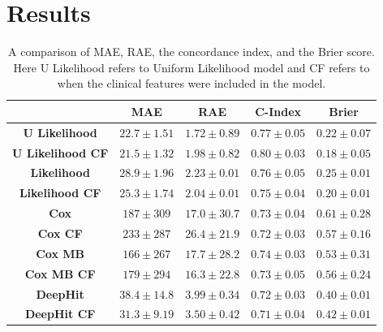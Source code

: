 \vspace{-0.5cm}

\section{Results} \label{sec:results}   
    \begin{table}
        \vspace{-0.5cm}
        
        \centering
        
        \captionsetup{singlelinecheck=false, justification=centering}
        \caption{
            \tiny
            A comparison of \gls{MAE}, \gls{RAE}, the concordance index, and the Brier score. Here U Likelihood refers to Uniform Likelihood model and CF refers to when the clinical features were included in the model.
        }
        
        \vspace{-0.25cm}
        
        \resizebox*{1.0\linewidth}{0.1\textheight}
        {
            \begin{tabular}{||c|cc|c|c||}
                \hline
                                            & \textbf{\gls{MAE}} & \textbf{\gls{RAE}} & \textbf{C-Index}  & \textbf{Brier}    \\
                \hline
                \textbf{U Likelihood}       & $22.7\pm1.51$      & $1.72\pm0.89$      & $0.77\pm0.05$     & $0.22\pm0.07$      \\
                \textbf{U Likelihood CF}    & $21.5\pm1.32$      & $1.98\pm0.82$      & $0.80\pm0.03$     & $0.18\pm0.05$      \\
                \textbf{Likelihood}         & $28.9\pm1.96$      & $2.23\pm0.01$      & $0.76\pm0.05$     & $0.25\pm0.01$      \\
                \textbf{Likelihood CF}      & $25.3\pm1.74$      & $2.04\pm0.01$      & $0.75\pm0.04$     & $0.20\pm0.01$      \\
                \hline
                \textbf{Cox}                & $187 \pm309 $      & $17.0\pm30.7$      & $0.73\pm0.04$     & $0.61\pm0.28$      \\
                \textbf{Cox CF}             & $233 \pm287 $      & $26.4\pm21.9$      & $0.72\pm0.03$     & $0.57\pm0.16$      \\
                \textbf{Cox \gls{MB}}       & $166 \pm267 $      & $17.7\pm28.2$      & $0.74\pm0.03$     & $0.53\pm0.31$      \\
                \textbf{Cox \gls{MB} CF}    & $179 \pm294 $      & $16.3\pm22.8$      & $0.73\pm0.05$     & $0.56\pm0.24$      \\
                \hline
                \textbf{DeepHit}            & $38.4\pm14.8$      & $3.99\pm0.34$      & $0.72\pm0.03$     & $0.40\pm0.01$      \\
                \textbf{DeepHit CF}         & $31.3\pm9.19$      & $3.50\pm0.42$      & $0.71\pm0.04$     & $0.42\pm0.01$      \\
                \hline
            \end{tabular}
        }
        \label{tab:table}
        

\end{table}
